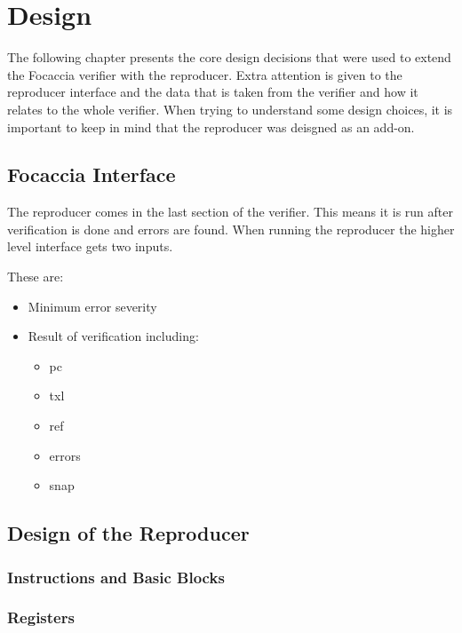 
\chapter{Design}\label{chapter:design}



The following chapter presents the core design decisions that were used to extend the Focaccia verifier with the reproducer.
Extra attention is given to the reproducer interface and the data that is taken from the verifier and how it relates to the whole verifier.
When trying to understand some design choices, it is important to keep in mind that the reproducer was deisgned as an add-on.

\section{Focaccia Interface}
The reproducer comes in the last section of the verifier.
This means it is run after verification is done and errors are found.
When running the reproducer the higher level interface gets two inputs.

These are:
\begin{itemize}
    \item Minimum error severity
    \item Result of verification including:
    \begin{itemize}
        \item pc
        \item txl
        \item ref
        \item errors
        \item snap
    \end{itemize}
\end{itemize}

\section{Design of the Reproducer}

\subsection{Instructions and Basic Blocks}

\subsection{Registers}

